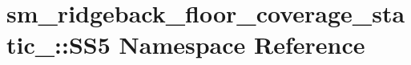 \hypertarget{namespacesm__ridgeback__floor__coverage__static__1_1_1SS5}{}\section{sm\+\_\+ridgeback\+\_\+floor\+\_\+coverage\+\_\+static\+\_\+:\+:S\+S5 Namespace Reference}
\label{namespacesm__ridgeback__floor__coverage__static__1_1_1SS5}
